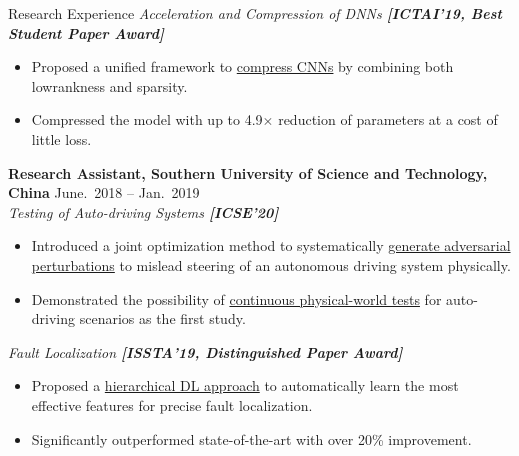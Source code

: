 \begin{rSection}{Research Experience}
\textit{Acceleration and Compression of DNNs \textbf{[{ICTAI'19, Best Student Paper Award}]}}
\begin{itemize}[noitemsep,topsep=-5pt]
    \item Proposed a unified framework to \underline{compress CNNs} by combining both lowrankness and sparsity.
    \item Compressed the model with up to 4.9$\times$ reduction of parameters at a cost of little loss. \\
\end{itemize}

{\bf Research Assistant, Southern University of Science and Technology, China}  \hfill { June.~2018 -- Jan.~2019} \\ 
\textit{Testing of Auto-driving Systems \textbf{[{ICSE'20}]}}
\begin{itemize}[noitemsep,topsep=-5pt]
    \item Introduced a joint optimization method to systematically \underline{generate adversarial perturbations} to mislead steering of an autonomous driving system physically.
    \item Demonstrated the possibility of \underline{continuous physical-world tests} for auto-driving scenarios as the first study.
\end{itemize}

\textit{Fault Localization \textbf{[{ISSTA'19, Distinguished Paper Award}]}}
\begin{itemize}[noitemsep,topsep=-5pt]
    \item Proposed a \underline{hierarchical DL approach} to automatically learn the most effective features for precise fault localization. 
    \item Significantly outperformed state-of-the-art with over 20\% improvement.
\end{itemize}
\end{rSection}
